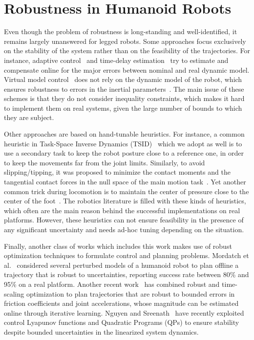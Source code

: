 
\section{Robustness in Humanoid Robots}
\label{sec:soa_robust}
Even though the problem of robustness is long-standing and well-identified, it remains largely unanswered for legged robots. 
Some approaches focus exclusively on the stability of the system rather than on the feasibility of the trajectories.
For instance, adaptive control~\cite{Kelly1989} and time-delay estimation~\cite{Jin2008} try to estimate and compensate online for the major errors between nominal and real dynamic model.
Virtual model control~\cite{Pratt} does not rely on the dynamic model of the robot, which ensures robustness to errors in the inertial parameters~\cite{dietrich2013multi}. 
The main issue of these schemes is that they do not consider inequality constraints, which makes it hard to implement them on real systems, given the large number of bounds to which they are subject.

Other approaches are based on hand-tunable heuristics. For instance, a common heuristic in Task-Space Inverse Dynamics (TSID)~\cite{DelPrete2014c} which we adopt as well is to use a secondary task to keep the robot posture close to a reference one, in order to keep the movements far from the joint limits. 
Similarly, to avoid slipping/tipping, it was proposed to minimize the contact moments and the tangential contact forces in the null space of the main motion task~\cite{Righetti2010}. 
Yet another common trick during locomotion is to maintain the center of pressure close to the center of the foot~\cite{Kajita2003}.
The robotics literature is filled with these kinds of heuristics, which often are the main reason behind the successful implementations on real platforms.
However, these heuristics can not ensure feasibility in the presence of any significant uncertainty and needs ad-hoc tuning depending on the situation.

Finally, another class of works which includes this work makes use of robust optimization techniques to formulate control and planning problems.
Mordatch et al.~\cite{Mordatch2015} considered several perturbed models of a humanoid robot to plan offline a trajectory that is robust to uncertainties, reporting success rate between 80\% and 95\% on a real platform. 
Another recent work~\cite{Luo} has combined robust and time-scaling optimization to plan trajectories that are robust to bounded errors in friction coefficients and joint accelerations, whose magnitude can be estimated online through iterative learning.
Nguyen and Sreenath~\cite{Nguyen} have recently exploited control Lyapunov functions and Quadratic Programs (QPs) to ensure stability despite bounded uncertainties in the linearized system dynamics. 

